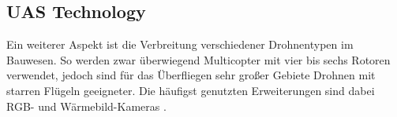 


\subsection{UAS Technology}


Ein weiterer Aspekt ist die Verbreitung verschiedener Drohnentypen im Bauwesen.
So werden zwar überwiegend Multicopter mit vier bis sechs Rotoren verwendet, jedoch sind für das Überfliegen sehr großer Gebiete Drohnen mit starren Flügeln geeigneter.
Die häufigst genutzten Erweiterungen sind dabei RGB- und Wärmebild-Kameras \cite[S. 90--92]{abaeano2021trends}.


